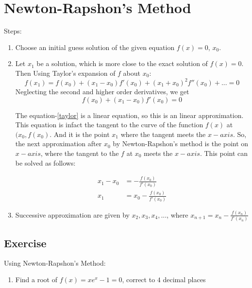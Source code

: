 \documentclass[aima203_lecturenotes_ku.tex]{subfiles}
\begin{document}
\section{Newton-Rapshon's Method}
Steps:
\begin{enumerate}
\item Choose an initial guess solution of the given equation \(f(x)=0\), \(x_0\).

\item Let \(x_1\) be a solution, which is more close to the exact solution of \(f(x)=0\). Then Using Taylor's expansion of \(f\) about \(x_0\): \[f(x_1)=f(x_0) + (x_1-x_0)f'(x_0) + (x_1+x_0)^2f''(x_0) + ... = 0\]
  Neglecting the second and higher order derivatives, we get
  \begin{equation}
    \label{taylor}
  f(x_0) + (x_1-x_0)f'(x_0)=0
  \end{equation}
  \begin{footnotesize}
    The equation-\ref{taylor} is a linear equation, so this is an linear approximation. This equation is infact the tangent to the curve of the function \(f(x)\) at $(x_0, f(x_0)$. And it is the point $x_1$ where the tangent meets the $x-axis$. So, the next approximation after $x_0$ by Newton-Rapshon's method is the point on $x-axis$, where the tangent to the $f$ at $x_0$ meets the $x-axis$. This point can be solved as follows:
   \end{footnotesize}
  \begin{align*}
    x_1-x_0 & = - \frac{f(x_0)}{f'(x_0)} \\
    x_1 &= x_0 - \frac{f(x_0)}{f'(x_0)}
  \end{align*}

\item Successive approximation are given by \(x_2, x_3, x_4, ...\), where
  \(\displaystyle x_{n+1} = x_n - \frac{f(x_n)}{f'(x_n)}\)
\end{enumerate}

\subsection{Exercise}
Using Newton-Rapshon's Method:
\begin{enumerate}
\item Find a root of \(f(x)=xe^x-1=0\), correct to \(4\) decimal places
\end{enumerate}
\end{document}
